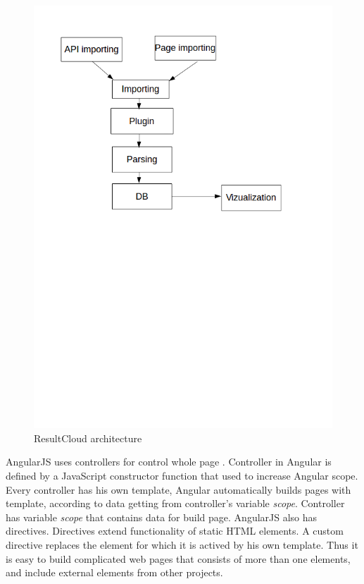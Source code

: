 \begin{figure}
  \centering
    \includegraphics[trim=0 13.41cm 0 0,scale=0.5]{fig/result-cloud.png}
  \caption{ResultCloud architecture}
  \label{fig:result_cloud}
\end{figure}

AngularJS uses controllers for control whole page . Controller in Angular is defined by a JavaScript constructor function that used to increase Angular scope. Every controller has his own template, Angular automatically builds pages with template, according to data getting from controller's variable \emph{scope}. Controller has variable \emph{scope} that contains data for build page. AngularJS also has directives. Directives extend functionality of static HTML elements. A custom directive replaces the element for which it is actived by his own template. Thus it is easy to build complicated web pages that consists of more than one elements, and include external elements from other projects.

